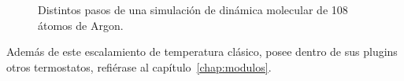 \begin{figure}[h!]
\centering
{}
\caption{Distintos pasos de una simulaci\'on de din\'amica molecular de 108 \'atomos de Argon.}
\label{fig:ar108scaltemp}
\end{figure}

Adem\'as de este escalamiento de temperatura cl\'asico, {\lpmd} posee dentro de sus plugins otros termostatos, refi\'erase al cap\'itulo~\ref{chap:modulos}.

